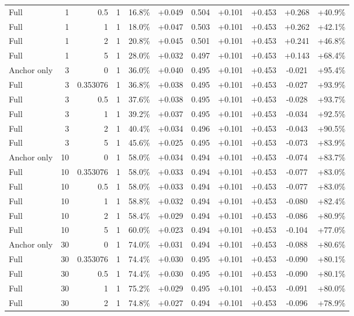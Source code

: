 \begin{table}[htbp]
\begin{tabular}{lrrrccccccc}
Full & 1 & 0.5 & 1 & 16.8\% & +0.049 & 0.504 & +0.101 & +0.453 & +0.268 & +40.9\% \\
Full & 1 & 1 & 1 & 18.0\% & +0.047 & 0.503 & +0.101 & +0.453 & +0.262 & +42.1\% \\
Full & 1 & 2 & 1 & 20.8\% & +0.045 & 0.501 & +0.101 & +0.453 & +0.241 & +46.8\% \\
Full & 1 & 5 & 1 & 28.0\% & +0.032 & 0.497 & +0.101 & +0.453 & +0.143 & +68.4\% \\
Anchor only & 3 & 0 & 1 & 36.0\% & +0.040 & 0.495 & +0.101 & +0.453 & -0.021 & +95.4\% \\
Full & 3 & 0.353076 & 1 & 36.8\% & +0.038 & 0.495 & +0.101 & +0.453 & -0.027 & +93.9\% \\
Full & 3 & 0.5 & 1 & 37.6\% & +0.038 & 0.495 & +0.101 & +0.453 & -0.028 & +93.7\% \\
Full & 3 & 1 & 1 & 39.2\% & +0.037 & 0.495 & +0.101 & +0.453 & -0.034 & +92.5\% \\
Full & 3 & 2 & 1 & 40.4\% & +0.034 & 0.496 & +0.101 & +0.453 & -0.043 & +90.5\% \\
Full & 3 & 5 & 1 & 45.6\% & +0.025 & 0.495 & +0.101 & +0.453 & -0.073 & +83.9\% \\
Anchor only & 10 & 0 & 1 & 58.0\% & +0.034 & 0.494 & +0.101 & +0.453 & -0.074 & +83.7\% \\
Full & 10 & 0.353076 & 1 & 58.0\% & +0.033 & 0.494 & +0.101 & +0.453 & -0.077 & +83.0\% \\
Full & 10 & 0.5 & 1 & 58.0\% & +0.033 & 0.494 & +0.101 & +0.453 & -0.077 & +83.0\% \\
Full & 10 & 1 & 1 & 58.8\% & +0.032 & 0.494 & +0.101 & +0.453 & -0.080 & +82.4\% \\
Full & 10 & 2 & 1 & 58.4\% & +0.029 & 0.494 & +0.101 & +0.453 & -0.086 & +80.9\% \\
Full & 10 & 5 & 1 & 60.0\% & +0.023 & 0.494 & +0.101 & +0.453 & -0.104 & +77.0\% \\
Anchor only & 30 & 0 & 1 & 74.0\% & +0.031 & 0.494 & +0.101 & +0.453 & -0.088 & +80.6\% \\
Full & 30 & 0.353076 & 1 & 74.4\% & +0.030 & 0.495 & +0.101 & +0.453 & -0.090 & +80.1\% \\
Full & 30 & 0.5 & 1 & 74.4\% & +0.030 & 0.495 & +0.101 & +0.453 & -0.090 & +80.1\% \\
Full & 30 & 1 & 1 & 75.2\% & +0.029 & 0.495 & +0.101 & +0.453 & -0.091 & +80.0\% \\
Full & 30 & 2 & 1 & 74.8\% & +0.027 & 0.494 & +0.101 & +0.453 & -0.096 & +78.9\% \\

\end{tabular}
\end{table}
